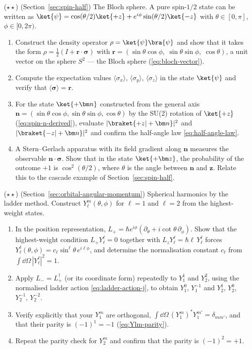 \begin{problemset}
\item ($\star\star$) (Section~\ref{sec:spin-half}) The Bloch sphere. A pure spin-$1/2$ state can be written as $\ket{\psi} = \cos(\theta/2)\ket{+z} + e^{i\phi}\sin(\theta/2)\ket{-z}$ with $\theta\in[0,\pi]$, $\phi\in[0,2\pi)$.
\begin{enumerate}
\item[(a)] Construct the density operator $\rho = \ket{\psi}\bra{\psi}$ and show that it takes the form $\rho = \frac12(I + \bm r\cdot\bm\sigma)$ with $\bm r = (\sin\theta\cos\phi,\;\sin\theta\sin\phi,\;\cos\theta)$, a unit vector on the sphere $S^2$ --- the Bloch sphere (\eqref{eq:bloch-vector}).
\item[(b)] Compute the expectation values $\langle\sigma_x\rangle$, $\langle\sigma_y\rangle$, $\langle\sigma_z\rangle$ in the state $\ket{\psi}$ and verify that $\langle\bm\sigma\rangle = \bm r$.
\item[(c)] For the state $\ket{+\bm n}$ constructed from the general axis $\bm n = (\sin\theta\cos\phi,\sin\theta\sin\phi,\cos\theta)$ by the SU(2) rotation of $\ket{+z}$ (\eqref{eq:spin-n-derived}), evaluate $|\braket{+z|+\bm n}|^2$ and $|\braket{-z|+\bm n}|^2$ and confirm the half-angle law \eqref{eq:half-angle-law}.
\item[(d)] A Stern--Gerlach apparatus with its field gradient along $\bm n$ measures the observable $\bm n\cdot\bm\sigma$. Show that in the state $\ket{+\bm z}$, the probability of the outcome $+1$ is $\cos^2(\theta/2)$, where $\theta$ is the angle between $\bm n$ and $\bm z$. Relate this to the cascade example of Section~\ref{sec:spin-half}.
\end{enumerate}

\item ($\star\star$) (Section~\ref{sec:orbital-angular-momentum}) Spherical harmonics by the ladder method. Construct $Y_\ell^m(\theta,\phi)$ for $\ell=1$ and $\ell=2$ from the highest-weight states.
\begin{enumerate}
\item[(a)] In the position representation, $L_+ = \hbar e^{i\phi}(\partial_\theta + i\cot\theta\,\partial_\phi)$. Show that the highest-weight condition $L_+ Y_\ell^\ell = 0$ together with $L_z Y_\ell^\ell = \hbar\ell\,Y_\ell^\ell$ forces $Y_\ell^\ell(\theta,\phi) = c_\ell \sin^\ell\theta\,e^{i\ell\phi}$, and determine the normalisation constant $c_\ell$ from $\int\dd\Omega\,|Y_\ell^\ell|^2 = 1$.
\item[(b)] Apply $L_- = L_+^\dagger$ (or its coordinate form) repeatedly to $Y_1^1$ and $Y_2^2$, using the normalised ladder action \eqref{eq:ladder-action-j}, to obtain $Y_1^0$, $Y_1^{-1}$ and $Y_2^1$, $Y_2^0$, $Y_2^{-1}$, $Y_2^{-2}$.
\item[(c)] Verify explicitly that your $Y_1^m$ are orthogonal, $\int\dd\Omega\,(Y_1^{m})^* Y_1^{m'} = \delta_{mm'}$, and that their parity is $(-1)^1 = -1$ (\eqref{eq:Ylm-parity}).
\item[(d)] Repeat the parity check for $Y_2^m$ and confirm that the parity is $(-1)^2 = +1$.
\end{enumerate}


\end{problemset}
